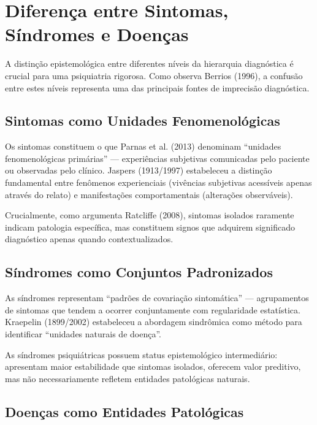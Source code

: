 \section{Diferença entre Sintomas, Síndromes e Doenças}
\label{sec:sintomas-sindromes}

A distinção epistemológica entre diferentes níveis da hierarquia diagnóstica é crucial para uma psiquiatria rigorosa. Como observa Berrios (1996), a confusão entre estes níveis representa uma das principais fontes de imprecisão diagnóstica.

\subsection{Sintomas como Unidades Fenomenológicas}

Os sintomas constituem o que Parnas et al. (2013) denominam \enquote{unidades fenomenológicas primárias} --- experiências subjetivas comunicadas pelo paciente ou observadas pelo clínico. Jaspers (1913/1997) estabeleceu a distinção fundamental entre fenômenos experienciais (vivências subjetivas acessíveis apenas através do relato) e manifestações comportamentais (alterações observáveis).

Crucialmente, como argumenta Ratcliffe (2008), sintomas isolados raramente indicam patologia específica, mas constituem signos que adquirem significado diagnóstico apenas quando contextualizados.

\subsection{Síndromes como Conjuntos Padronizados}

As síndromes representam \enquote{padrões de covariação sintomática} --- agrupamentos de sintomas que tendem a ocorrer conjuntamente com regularidade estatística. Kraepelin (1899/2002) estabeleceu a abordagem sindrômica como método para identificar \enquote{unidades naturais de doença}.

As síndromes psiquiátricas possuem status epistemológico intermediário: apresentam maior estabilidade que sintomas isolados, oferecem valor preditivo, mas não necessariamente refletem entidades patológicas naturais.

\subsection{Doenças como Entidades Patológicas}

